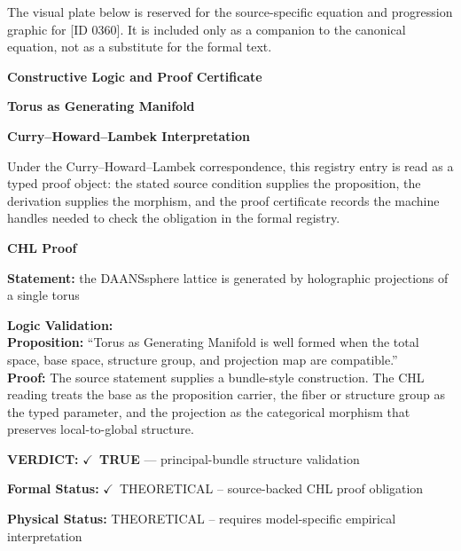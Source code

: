 \begingroup\footnotesize\sloppy
The visual plate below is reserved for the source-specific equation and progression graphic for [ID 0360]. It is included only as a companion to the canonical equation, not as a substitute for the formal text.
\par\endgroup
\ifTZPDarkEdition
{}
\fi

\clearpage
\begingroup\tzpsupportsetup
\noindent\textbf{\fontsize{10.8pt}{12.8pt}\selectfont [ID 0360] Constructive Logic and Proof Certificate}\par
\noindent\textbf{\fontsize{10pt}{12pt}\selectfont Torus as Generating Manifold}\par
\vspace{0.45em}
\begingroup
\footnotesize
\setlength{\parskip}{0.22em}
\setlength{\parindent}{0pt}
\noindent\textbf{Curry--Howard--Lambek Interpretation}\par
Under the Curry--Howard--Lambek correspondence, this registry entry is read as a typed proof
object: the stated source condition supplies the proposition, the derivation supplies the
morphism, and the proof certificate records the machine handles needed to check the obligation
in the formal registry.

\vspace{0.45em}
\noindent\textbf{CHL Proof}\par
\textbf{Statement:} the DAANSsphere lattice is generated by holographic projections of a single torus

\textbf{Logic Validation:}\\
\textbf{Proposition:} ``Torus as Generating Manifold is well formed when the total space, base space, structure
group, and projection map are compatible.''\\
\textbf{Proof:} The source statement supplies a bundle-style construction. The CHL reading treats the
base as the proposition carrier, the fiber or structure group as the typed parameter,
and the projection as the categorical morphism that preserves local-to-global structure.

\textbf{VERDICT:} \ensuremath{\checkmark}\ \textbf{TRUE} --- principal-bundle structure validation

\textbf{Formal Status:} \ensuremath{\checkmark}\ THEORETICAL -- source-backed CHL proof obligation

\textbf{Physical Status:} THEORETICAL -- requires model-specific empirical interpretation
\par\vspace{0.45em}
\par
\ifTZPDarkEdition
{}
\fi
\endgroup
\endgroup
